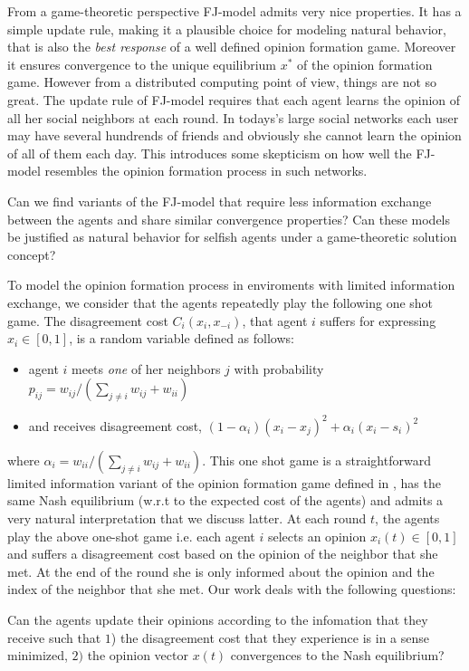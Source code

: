 From a game-theoretic perspective FJ-model admits
very nice properties. It has a simple update rule, making it
a plausible choice for modeling natural behavior, that
is also the \emph{best response} of a well 
defined opinion formation game. Moreover it ensures
convergence to the unique equilibrium $x^*$ of the opinion 
formation game. However from a 
distributed computing point of view, things are not
so great. The update rule of FJ-model requires that each agent learns
the opinion of all her social neighbors at each 
round. In todays's large social networks each user
may have several hundrends of friends and obviously
she cannot learn the opinion of all of them each day.
This introduces some skepticism on how well the 
FJ-model resembles the opinion formation process in such
networks.

\begin{question}
Can we find variants of the FJ-model that 
require less information exchange between the agents
and share similar convergence properties?
Can these models be justified as natural behavior for selfish
agents under a game-theoretic solution concept?
\end{question}

To model the opinion formation process in enviroments
with limited information exchange, we consider
that the agents repeatedly play the following one shot game.
The disagreement cost $C_i(x_i,x_{-i})$, that
agent $i$ suffers for expressing $x_i \in [0,1]$, is a random variable
defined as follows:
\begin{itemize}
 \item agent $i$ meets \emph{one} of her neighbors $j$ with probability
 $p_{ij}=w_{ij}/(\sum_{j\neq i}w_{ij}+w_{ii})$
 \item and receives disagreement cost, $(1-\alpha_i)(x_i-x_j)^2 + \alpha_i(x_i-s_i)^2$ 
\end{itemize}
where $\alpha_i=w_{ii}/(\sum_{j\neq i}w_{ij}+w_{ii})$. This one shot game
is a straightforward limited information variant of the opinion formation game
defined in \cite{BKO11}, has the same Nash equilibrium (w.r.t 
to the expected cost of the agents) and admits a very 
natural interpretation that we discuss latter.
At each round $t$, the agents play the above one-shot game i.e.
each agent $i$ selects an opinion $x_i(t)\in [0,1]$ and 
suffers a disagreement cost based on the opinion of the neighbor
that she met. At the end of the round she is only informed about
the opinion and the index of the neighbor that she met. Our work
deals with the following questions:
\begin{question}
Can the agents update their opinions according to the 
infomation that they receive such that
$1$) the disagreement cost that they experience is in a
sense minimized, $2)$ the opinion vector $x(t)$ convergences 
to the Nash equilibrium?
\end{question}

